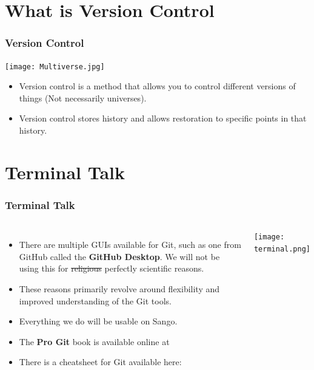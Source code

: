 \documentclass{beamer}
\begin{document}

\section{What is Version Control}

\begin{frame}[fragile]
\frametitle{Version Control}
\begin{center}\texttt{[image: Multiverse.jpg]}\end{center}
\begin{itemize}
\item Version control is a method that allows you to control different versions of things (Not necessarily universes).
\item Version control stores history and allows restoration to specific points in that history.
\end{itemize}

\end{frame}

\section{Terminal Talk}

\begin{frame}[fragile]
\frametitle{Terminal Talk}
\begin{columns}

\begin{itemize}
\item There are multiple GUIs available for Git, such as one from GitHub called the \textbf{GitHub Desktop}. We will not be using this for \sout{religious} perfectly scientific reasons.
\item These reasons primarily revolve around flexibility and improved understanding of the Git tools.
\item Everything we do will be usable on Sango.
\item The \textbf{Pro Git} book is available online at \href{https://git-scm.com/book/}{\textbf{\color{blue}{git-scm.com/book}}}
\item There is a cheatsheet for Git available here: \href{https://www.git-tower.com/learn/cheat-sheets/git}{\textbf{\color{blue}{https://www.git-tower.com/learn/cheat-sheets/git}}}
\end{itemize}

\texttt{[image: terminal.png]}
\end{columns}
\end{frame}
\end{document}
